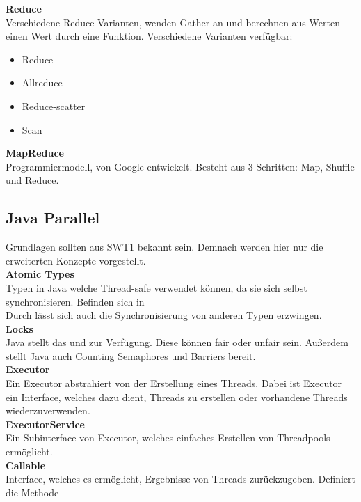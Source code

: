 \textbf{Reduce}\\
Verschiedene Reduce Varianten, wenden Gather an und berechnen aus Werten einen Wert durch eine Funktion.
Verschiedene Varianten verfügbar:
\begin{itemize}
  \item Reduce
  \item Allreduce
  \item Reduce-scatter
  \item Scan
\end{itemize}


\textbf{MapReduce}\\
Programmiermodell, von Google entwickelt. Besteht aus 3 Schritten: Map, Shuffle und Reduce.

\newpage
\subsection{Java Parallel}%
\label{pp:sub:javas-parallel}
Grundlagen sollten aus SWT1 bekannt sein. Demnach werden hier nur die erweiterten Konzepte vorgestellt.\\

\textbf{Atomic Types}\\
Typen in Java welche Thread-safe verwendet können, da sie sich selbst synchronisieren.
Befinden sich in \\
Durch  lässt sich auch die Synchronisierung von anderen Typen erzwingen.\\

\textbf{Locks}\\
Java stellt das  und  zur Verfügung. Diese können fair oder unfair sein.
Außerdem stellt Java auch Counting Semaphores und Barriers bereit.\\

\textbf{Executor}\\
Ein Executor abstrahiert von der Erstellung eines Threads. Dabei ist Executor ein Interface, welches dazu dient, Threads zu erstellen
oder vorhandene Threads wiederzuverwenden.\\

\textbf{ExecutorService}\\
Ein Subinterface von Executor, welches einfaches Erstellen von Threadpools ermöglicht.\\

\textbf{Callable}\\
Interface, welches es ermöglicht, Ergebnisse von Threads zurückzugeben.
Definiert die Methode \\

